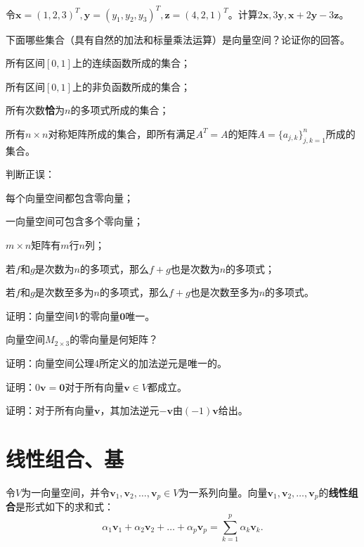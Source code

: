 \begin{problemset}
\item 令$\mathbf{x}=(1,2,3)^{T},\mathbf{y}=(y_{1},y_{2},y_{3})^{T},\mathbf{z}=(4,2,1)^{T}$。计算$2\mathbf{x},3\mathbf{y},\mathbf{x}+2\mathbf{y}-3\mathbf{z}$。
\item 下面哪些集合（具有自然的加法和标量乘法运算）是向量空间？论证你的回答。
\begin{probenumerate}
    \item 所有区间$[0,1]$上的连续函数所成的集合；
    \item 所有区间$[0,1]$上的非负函数所成的集合；
    \item 所有次数{\bf 恰}为$n$的多项式所成的集合；
    \item 所有$n\times n$对称矩阵所成的集合，即所有满足$A^T=A$的矩阵$A=\{a_{j,k}\}_{j,k=1}^n$所成的集合。
\end{probenumerate}
\item 判断正误：
\begin{probenumerate}
    \item 每个向量空间都包含零向量；
    \item 一向量空间可包含多个零向量；
    \item $m\times n$矩阵有$m$行$n$列；
    \item 若$f$和$g$是次数为$n$的多项式，那么$f+g$也是次数为$n$的多项式；
    \item 若$f$和$g$是次数至多为$n$的多项式，那么$f+g$也是次数至多为$n$的多项式。
\end{probenumerate}
\item 证明：向量空间$V$的零向量$\mathbf{0}$唯一。
\item 向量空间$M_{2\times 3}$的零向量是何矩阵？
\item 证明：向量空间公理4所定义的加法逆元是唯一的。
\item 证明：$0\mathbf{v} = \mathbf{0}$对于所有向量$\mathbf{v}\in V$都成立。
\item 证明：对于所有向量$\mathbf{v}$，其加法逆元$-\mathbf{v}$由$(-1)\mathbf{v}$给出。
\end{problemset}

\section{线性组合、基}

令$V$为一向量空间，并令$\mathbf{v}_{1},\mathbf{v}_{2},\ldots,\mathbf{v}_{p}\in V$为一系列向量。向量$\mathbf{v}_{1},\mathbf{v}_{2},\ldots,\mathbf{v}_{p}$的{\bf 线性组合}是形式如下的求和式：
\[\alpha_1\mathbf{v}_1+\alpha_2\mathbf{v}_2+\ldots+\alpha_p\mathbf{v}_p=\sum_{k=1}^p\alpha_k\mathbf{v}_k.\]

